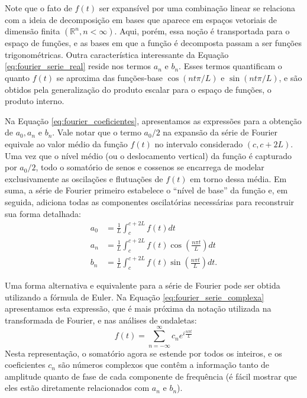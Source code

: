 Note que o fato de \(f(t)\) ser expansível por uma combinação linear se relaciona com a ideia de decomposição em bases que aparece em espaços vetoriais de dimensão finita \(\left(\mathbb{R}^{n}, n < \infty\right)\). Aqui, porém, essa noção é transportada para o espaço de funções, e as bases em que a função é decomposta passam a ser funções trigonométricas. Outra característica interessante da Equação \ref{eq:fourier_serie_real} reside nos termos \(a_n\) e \(b_n\). Esses termos quantificam o quanto \(f(t)\) se aproxima das funções-base \(\cos\left(nt\pi/L\right)\) e \(\sin\left(nt\pi/L\right)\), e são obtidos pela generalização do produto escalar para o espaço de funções, o produto interno.

Na Equação \ref{eq:fourier_coeficientes}, apresentamos as expressões para a obtenção de \(a_0, a_n\) e \(b_n\). Vale notar que o termo \(a_0/2\) na expansão da série de Fourier equivale ao valor médio da função \(f(t)\) no intervalo considerado \((c, c + 2L)\). Uma vez que o nível médio (ou o deslocamento vertical) da função é capturado por \(a_0/2\), todo o somatório de senos e cossenos se encarrega de modelar exclusivamente as oscilações e flutuações de \(f(t)\) em torno dessa média. Em suma, a série de Fourier primeiro estabelece o ``nível de base'' da função e, em seguida, adiciona todas as componentes oscilatórias necessárias para reconstruir sua forma detalhada:
\begin{equation}
  \begin{aligned}
      a_0 &= \frac{1}{L}\int_{c}^{c + 2L} f(t) dt \\
      a_n &= \frac{1}{L}\int_{c}^{c + 2L} f(t)\cos\left(\frac{n\pi t}{L}\right) dt \\
      b_n &= \frac{1}{L}\int_{c}^{c + 2L} f(t)\sin\left(\frac{n\pi t}{L}\right) dt.
  \end{aligned}
  \label{eq:fourier_coeficientes}
\end{equation}

Uma forma alternativa e equivalente para a série de Fourier pode ser obtida utilizando a fórmula de Euler. Na Equação \ref{eq:fourier_serie_complexa} apresentamos esta expressão, que é mais próxima da notação utilizada na transformada de Fourier, e nas análises de ondaletas: 
\begin{equation}
  f(t) = \sum_{n=-\infty}^{\infty} c_n e^{i \frac{n\pi t}{L}}
  \label{eq:fourier_serie_complexa}
\end{equation}
Nesta representação, o somatório agora se estende por todos os inteiros, e os coeficientes \(c_n\) são números complexos que contêm a informação tanto de amplitude quanto de fase de cada componente de frequência (é fácil mostrar que eles estão diretamente relacionados com \(a_n\) e \(b_n\)). 


